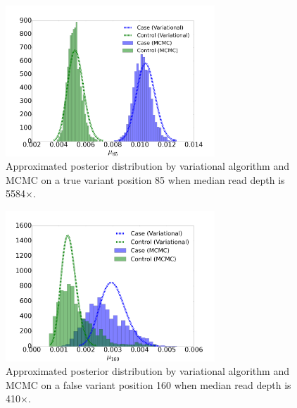 \documentclass[11pt,reqno]{amsart}
\begin{document}
\begin{figure}[htbp]
\centering
\includegraphics[width=0.7\textwidth]{figs/position_85_5584_mcmc_vs_var_mu_fig1.png}
\caption{Approximated posterior distribution by variational algorithm and MCMC on a true variant position 85 when median read depth is 5584$\times$.}
\label{tbl:compare1}
\end{figure}

\begin{figure}[htbp]
\centering
\includegraphics[width=0.7\textwidth]{figs/position_160_410_mcmc_vs_var_mu_fig2.png}
\caption{Approximated posterior distribution by variational algorithm and MCMC on a false variant position 160 when median read depth is 410$\times$.}
\label{tbl:compare2}
\end{figure}

\end{document}
